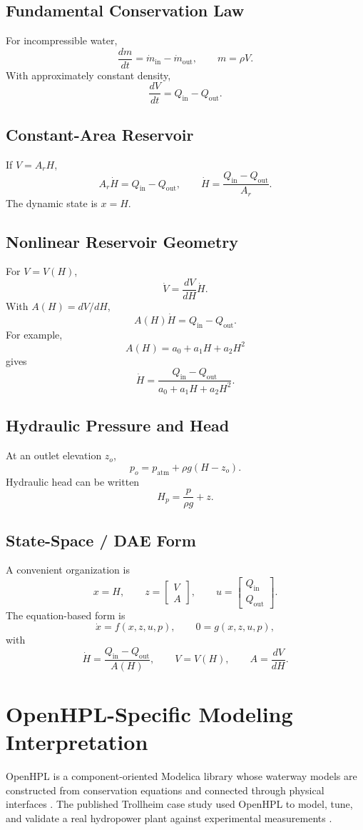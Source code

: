 \documentclass[11pt,a4paper]{article}
\begin{document}
\subsection{Fundamental Conservation Law}
For incompressible water,
\[
\frac{dm}{dt}=\dot m_{\mathrm{in}}-\dot m_{\mathrm{out}},\qquad m=\rho V.
\]
With approximately constant density,
\[
\boxed{\frac{dV}{dt}=Q_{\mathrm{in}}-Q_{\mathrm{out}}}.
\]

\subsection{Constant-Area Reservoir}
If $V=A_rH$,
\[
\boxed{A_r\dot H=Q_{\mathrm{in}}-Q_{\mathrm{out}}},
\qquad
\boxed{\dot H=\frac{Q_{\mathrm{in}}-Q_{\mathrm{out}}}{A_r}}.
\]
The dynamic state is $x=H$.

\subsection{Nonlinear Reservoir Geometry}
For $V=V(H)$,
\[
\dot V=\frac{dV}{dH}\dot H.
\]
With $A(H)=dV/dH$,
\[
\boxed{A(H)\dot H=Q_{\mathrm{in}}-Q_{\mathrm{out}}}.
\]
For example,
\[
A(H)=a_0+a_1H+a_2H^2
\]
gives
\[
\dot H=\frac{Q_{\mathrm{in}}-Q_{\mathrm{out}}}{a_0+a_1H+a_2H^2}.
\]

\subsection{Hydraulic Pressure and Head}
At an outlet elevation $z_o$,
\[
p_o=p_{\mathrm{atm}}+\rho g(H-z_o).
\]
Hydraulic head can be written
\[
H_p=\frac{p}{\rho g}+z.
\]

\subsection{State-Space / DAE Form}
A convenient organization is
\[
x=H,
\qquad
z=\begin{bmatrix}V\\A\end{bmatrix},
\qquad
u=\begin{bmatrix}Q_{\mathrm{in}}\\Q_{\mathrm{out}}\end{bmatrix}.
\]
The equation-based form is
\[
\dot x=f(x,z,u,p),\qquad 0=g(x,z,u,p),
\]
with
\[
\dot H=\frac{Q_{\mathrm{in}}-Q_{\mathrm{out}}}{A(H)},\qquad V=V(H),\qquad A=\frac{dV}{dH}.
\]

\section{OpenHPL-Specific Modeling Interpretation}
OpenHPL is a component-oriented Modelica library whose waterway models are constructed from conservation equations and connected through physical interfaces \cite{OpenHPLUserGuide}. The published Trollheim case study used OpenHPL to model, tune, and validate a real hydropower plant against experimental measurements \cite{Trollheim2019}.
\end{document}
